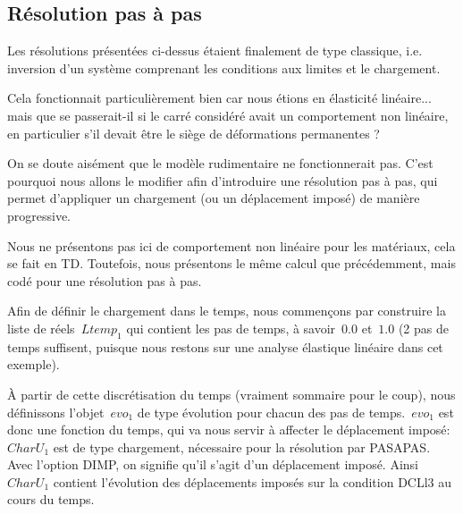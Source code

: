 \medskip
\subsection{Résolution pas à pas}

Les résolutions présentées ci-dessus étaient finalement de type classique, i.e. inversion d'un système comprenant les conditions aux limites et le chargement.

Cela fonctionnait particulièrement bien car nous étions en élasticité linéaire... mais que se passerait-il si le carré considéré avait un comportement non linéaire, en particulier s'il devait être le siège de déformations permanentes ?

On se doute aisément que le modèle rudimentaire ne fonctionnerait pas. C'est pourquoi nous allons le modifier afin d'introduire une résolution pas à pas, qui permet d'appliquer un chargement (ou un déplacement imposé) de manière progressive.

\medskip
Nous ne présentons pas ici de comportement non linéaire pour les matériaux, cela se fait en TD. Toutefois, nous présentons le même calcul que précédemment, mais codé pour une résolution pas à pas.

\medskip
Afin de définir le chargement dans le temps, nous commençons par construire la liste de réels~$Ltemp_1$ qui contient les pas de temps, à savoir~$0.0$ et~$1.0$ (2 pas de temps suffisent, puisque nous restons sur une analyse élastique linéaire dans cet exemple).

À partir de cette discrétisation du temps (vraiment sommaire pour le coup), nous définissons l'objet~$evo_1$ de type évolution pour chacun des pas de temps.~$evo_1$ est donc une fonction du temps, qui va nous servir à affecter le déplacement imposé:~$CharU_1$ est de type chargement, nécessaire pour la résolution par PASAPAS. Avec l'option DIMP, on signifie qu'il s'agit d'un déplacement imposé. Ainsi~$CharU_1$ contient l'évolution des déplacements imposés sur la condition DCLl3 au cours du temps.


